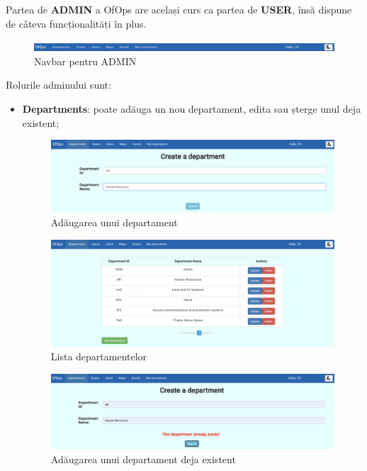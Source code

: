Partea de \textbf{ADMIN} a OfOps are același curs ca partea de \textbf{USER}, însă dispune de câteva funcționalități în plus. 

\begin{figure}[!htb]
    \centering
    \includegraphics[width=0.9\linewidth]{images/navadm.png}
    \caption{Navbar pentru ADMIN}
    \label{fig:navadm}
\end{figure}

Rolurile adminului sunt:
\begin{itemize}[left=1.5cm]
    \item \textbf{Departments}: poate adăuga un nou departament, edita sau șterge unul deja existent;

    \begin{figure}[!htb]
        \centering
        \includegraphics[width=0.9\linewidth]{images/adaugdep.png}
        \caption{Adăugarea unui departament}
        \label{fig:adaugdep}
    \end{figure}

    \begin{figure}[!htb]
        \centering
        \includegraphics[width=0.9\linewidth]{images/listadep.png}
        \caption{Lista departamentelor}
        \label{fig:listadep}
    \end{figure}

    \begin{figure}[!htb]
        \centering
        \includegraphics[width=0.9\linewidth]{images/exceptiedep.png}
        \caption{Adăugarea unui departament deja existent}
        \label{fig:exceptiedep}
    \end{figure}
    

\end{itemize}
